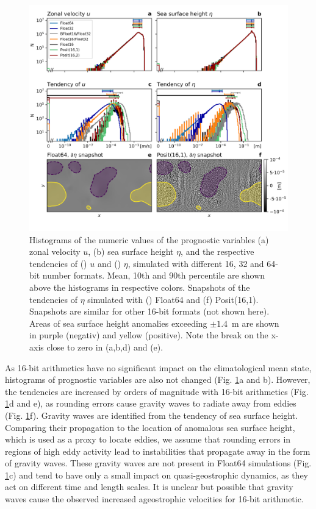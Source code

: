 \documentclass[draft]{agujournal2019}
\begin{document}
\begin{figure}
\includegraphics[width=1\textwidth]{tendency_hist.png}
\caption{Histograms of the numeric values of the prognostic variables (a) zonal
velocity $u$, (b) sea surface height $\eta$, and the respective tendencies of
() $u$ and () $\eta$, simulated with different 16, 32
and 64-bit number formats. Mean, 10th and 90th percentile are shown above the
histograms in respective colors. Snapshots of the tendencies of $\eta$ simulated
with () Float64 and (f) Posit(16,1). Snapshots are similar for other 16-bit formats
(not shown here). Areas of sea surface height anomalies exceeding $\pm1.4$~m are
shown in purple (negativ) and
yellow (positive). Note the break on the x-axis close to zero in (a,b,d) and (e).}
\label{fig:tend}
\end{figure}

As 16-bit arithmetics have no significant impact on the climatological mean state,
histograms of prognostic variables are also not changed (Fig. \ref{fig:tend}a and b).
However, the tendencies are increased by orders of magnitude with 16-bit arithmetics
(Fig. \ref{fig:tend}d and e), as rounding errors cause gravity waves to radiate
away from eddies (Fig. \ref{fig:tend}f). Gravity waves are identified from the
tendency of sea surface height. Comparing their propagation to the location of
anomalous sea surface height, which is used as a proxy to locate eddies, we
assume that rounding errors in regions of high eddy activity lead to instabilities
that propagate away in the form of gravity waves. These gravity waves are not
present in Float64 simulations (Fig. \ref{fig:tend}c) and tend to have only a
small impact on quasi-geostrophic dynamics, as they act on different time and
length scales. It is unclear but possible that gravity waves cause the observed
increased ageostrophic velocities for 16-bit arithmetic.
\end{document}
